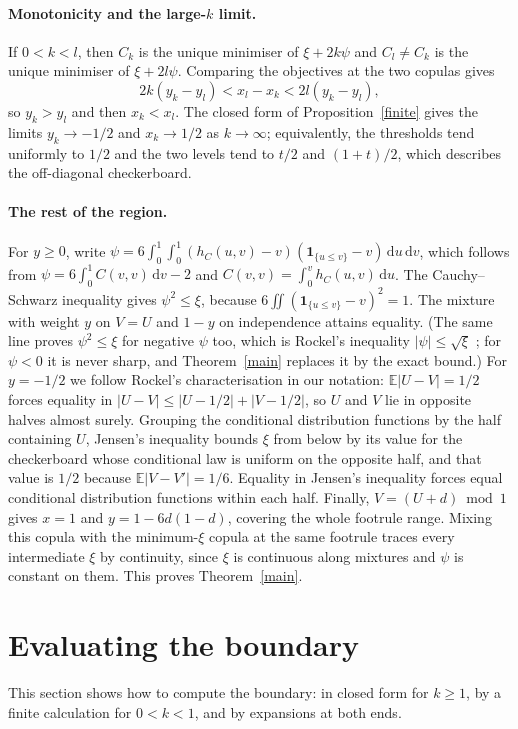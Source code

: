 \documentclass[11pt,a4paper]{article}
\theoremstyle{remark}
\newcommand{\E}{\mathbb E}
\newcommand{\1}{\mathbf 1}
\newcommand{\dd}{\,\mathrm d}
\begin{document}
\paragraph{Monotonicity and the large-$k$ limit.} If $0<k<l$, then $C_k$ is the unique minimiser of $\xi+2k\psi$ and $C_l\neq C_k$ is the unique minimiser of $\xi+2l\psi$. Comparing the objectives at the two copulas gives
\[
 2k(y_k-y_l)<x_l-x_k<2l(y_k-y_l),
\]
so $y_k>y_l$ and then $x_k<x_l$. The closed form of Proposition~\ref{finite} gives the limits $y_k\to-1/2$ and $x_k\to1/2$ as $k\to\infty$; equivalently, the thresholds tend uniformly to $1/2$ and the two levels tend to $t/2$ and $(1+t)/2$, which describes the off-diagonal checkerboard.

\paragraph{The rest of the region.} For $y\ge0$, write $\psi=6\int_0^1\!\int_0^1(h_C(u,v)-v)(\1_{\{u\le v\}}-v)\dd u\dd v$, which follows from $\psi=6\int_0^1C(v,v)\dd v-2$ and $C(v,v)=\int_0^v h_C(u,v)\dd u$. The Cauchy--Schwarz inequality gives $\psi^2\le\xi$, because $6\iint(\1_{\{u\le v\}}-v)^2=1$. The mixture with weight $y$ on $V=U$ and $1-y$ on independence attains equality. (The same line proves $\psi^2\le\xi$ for negative $\psi$ too, which is Rockel's inequality $|\psi|\le\sqrt\xi$ \cite[Corollary~2]{rockel}; for $\psi<0$ it is never sharp, and Theorem~\ref{main} replaces it by the exact bound.) For $y=-1/2$ we follow Rockel's characterisation in our notation: $\E|U-V|=1/2$ forces equality in $|U-V|\le|U-1/2|+|V-1/2|$, so $U$ and $V$ lie in opposite halves almost surely. Grouping the conditional distribution functions by the half containing $U$, Jensen's inequality bounds $\xi$ from below by its value for the checkerboard whose conditional law is uniform on the opposite half, and that value is $1/2$ because $\E|V-V'|=1/6$. Equality in Jensen's inequality forces equal conditional distribution functions within each half. Finally, $V=(U+d)\bmod 1$ gives $x=1$ and $y=1-6d(1-d)$, covering the whole footrule range. Mixing this copula with the minimum-$\xi$ copula at the same footrule traces every intermediate $\xi$ by continuity, since $\xi$ is continuous along mixtures and $\psi$ is constant on them. This proves Theorem~\ref{main}.

\section{Evaluating the boundary}\label{sec:eval}
This section shows how to compute the boundary: in closed form for $k\ge1$, by a finite calculation for $0<k<1$, and by expansions at both ends.
\end{document}
